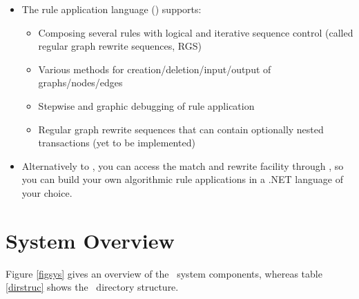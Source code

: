 \begin{itemize}
  \item The rule application language (\GrShell) supports:
  \begin{itemize}
    \item Composing several rules with logical and iterative sequence control (called regular graph rewrite sequences, RGS)
    \item Various methods for creation/deletion/input/output of graphs/nodes/edges 
    \item Stepwise and graphic debugging of rule application
    \item Regular graph rewrite sequences that can contain optionally nested transactions (yet to be implemented)
  \end{itemize}
  
  \item Alternatively to \GrShell, you can access the match and rewrite facility through \LibGr, so you can build your own algorithmic rule applications in a .NET language of your choice. 
\end{itemize}


\section{System Overview}

Figure \ref{figsys} gives an overview of the \GrG\ system components, whereas table \ref{dirstruc} shows the \GrG\ directory structure.

